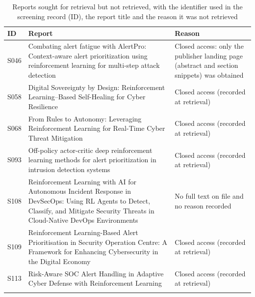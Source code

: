 \documentclass[pdflatex,sn-basic]{sn-jnl}
\begin{document}
\begin{table}[!htbp]
\caption{Reports sought for retrieval but not retrieved, with the identifier used in the screening record (ID), the report title and the reason it was not retrieved}\label{tab:notret}
\footnotesize
\begin{tabularx}{\textwidth}{@{}lLP{3.4cm}@{}}
\toprule
ID & Report & Reason \\
\midrule
S046 & Combating alert fatigue with AlertPro: Context-aware alert prioritization using reinforcement learning for multi-step attack detection & Closed access: only the publisher landing page (abstract and section snippets) was obtained \\
S058 & Digital Sovereignty by Design: Reinforcement Learning--Based Self-Healing for Cyber Resilience & Closed access (recorded at retrieval) \\
S068 & From Rules to Autonomy: Leveraging Reinforcement Learning for Real-Time Cyber Threat Mitigation & Closed access (recorded at retrieval) \\
S093 & Off-policy actor-critic deep reinforcement learning methods for alert prioritization in intrusion detection systems & Closed access (recorded at retrieval) \\
S108 & Reinforcement Learning with AI for Autonomous Incident Response in DevSecOps: Using RL Agents to Detect, Classify, and Mitigate Security Threats in Cloud-Native DevOps Environments & No full text on file and no reason recorded \\
S109 & Reinforcement Learning-Based Alert Prioritisation in Security Operation Centre: A Framework for Enhancing Cybersecurity in the Digital Economy & Closed access (recorded at retrieval) \\
S113 & Risk-Aware SOC Alert Handling in Adaptive Cyber Defense with Reinforcement Learning & Closed access (recorded at retrieval) \\
\botrule
\end{tabularx}
\end{table}
\end{document}
